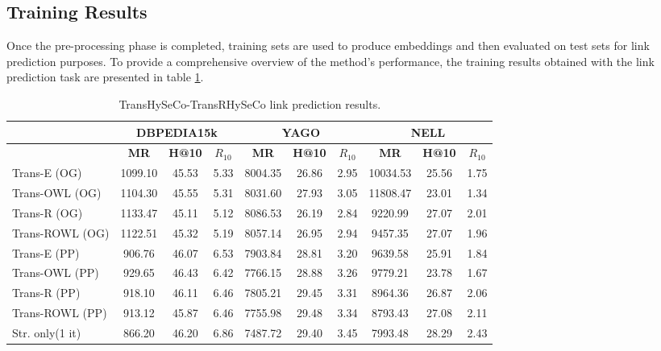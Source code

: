 \documentclass[sigconf]{acmart}
\begin{document}

\subsection{Training Results}
\label{first iteration results section}

Once the pre-processing phase is completed,  training sets are used to produce embeddings and then evaluated on test sets for link prediction purposes. To provide a comprehensive overview of the method's performance, the training results obtained with the link prediction task are presented in table \ref{table:results Hybrid Training}. 
\begin{scriptsize}
\begin{table}[t]
\caption{TransHySeCo-TransRHySeCo link prediction results.}
\label{table:results Hybrid Training}
\begin{tabular}{|l|c|c|c|c|c|c|c|c|c|}
\hline
\multicolumn{1}{|c|}{} & \multicolumn{3}{c|}{\textbf{DBPEDIA15k}} & \multicolumn{3}{c|}{\textbf{YAGO}} & \multicolumn{3}{c|}{\textbf{NELL}} \\
\hline
& \textbf{MR} & \textbf{H@10} & \textbf{\(R_{10}\)} & \textbf{MR} & \textbf{H@10} & \textbf{\(R_{10}\)} & \textbf{MR} & \textbf{H@10} & \textbf{\(R_{10}\)} \\
\hline
Trans-E (OG) & 1099.10 & 45.53 & 5.33 & 8004.35 & 26.86 & 2.95 & 10034.53 & 25.56 & 1.75 \\
\hline
Trans-OWL (OG) & 1104.30 & 45.55 & 5.31 & 8031.60 & 27.93 & 3.05 & 11808.47 & 23.01 & 1.34 \\
\hline
Trans-R  (OG) & 1133.47 & 45.11 & 5.12 & 8086.53 & 26.19 & 2.84 & 9220.99 & 27.07 & 2.01 \\
\hline
Trans-ROWL  (OG) & 1122.51 & 45.32 & 5.19 & 8057.14 & 26.95 & 2.94 & 9457.35 & 27.07 & 1.96 \\
\hline
Trans-E (PP) & 906.76 & 46.07 & 6.53 & 7903.84 & 28.81 & 3.20 & 9639.58 & 25.91 & 1.84 \\
\hline
Trans-OWL  (PP) & 929.65 & 46.43 & 6.42 & 7766.15 & 28.88 & 3.26 & 9779.21 & 23.78 & 1.67 \\
\hline
Trans-R  (PP) & 918.10 & 46.11 & 6.46 & 7805.21 & 29.45 & 3.31 & 8964.36 & 26.87 & 2.06 \\
\hline
Trans-ROWL  (PP) & 913.12 & 45.87 & 6.46 & 7755.98 & 29.48 & 3.34 & 8793.43 & 27.08 & 2.11 \\
\hline
Str. only(1 it) & 866.20 & 46.20 & 6.86 & 7487.72 & 29.40 & 3.45 & 7993.48 & 28.29 & 2.43 \\

\end{tabular}
\end{table}
\end{scriptsize}
\end{document}
